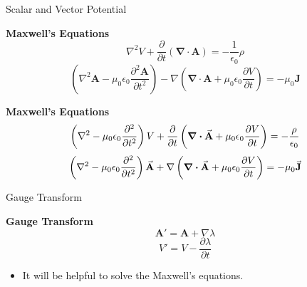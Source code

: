 \documentclass[9pt]{beamer}
\begin{document}
\begin{frame}{Scalar and Vector Potential}
    \begin{beamerboxesrounded}[shadow=true]{\bf Maxwell's Equations}
        \begin{equation}
            \nabla^{2} V+\frac{\partial}{\partial t}(\mathbf{\nabla} \cdot \mathbf{A})=-\frac{1}{\epsilon_{0}} \rho
        \end{equation}
        \begin{equation}
            \left(\nabla^{2} \mathbf{A}-\mu_{0} \epsilon_{0} \frac{\partial^{2} \mathbf{A}}{\partial t^{2}}\right)-\nabla\left(\mathbf{\nabla} \cdot \mathbf{A}+\mu_{0} \epsilon_{0} \frac{\partial V}{\partial t}\right)=-\mu_{0} \mathbf{J}
        \end{equation}
    \end{beamerboxesrounded}    
    \vspace{.5em}
    \begin{beamerboxesrounded}[shadow=true]{\bf Maxwell's Equations}
        \begin{equation}
            \left( \nabla^2 - \mu_0 \epsilon_0 \pdv[2]{}{t} \right) V + \pdv{}{t} \left( \div{\va{A}} + \mu_0 \epsilon_0 \pdv{V}{t} \right) = -\frac{\rho}{\epsilon_0}
        \end{equation}
        \begin{equation}
            \left( \nabla^2 - \mu_0 \epsilon_0 \pdv[2]{}{t} \right) \va{A} + \nabla \left( \div{\va{A}} + \mu_0 \epsilon_0 \pdv{V}{t} \right) = -\mu_0 \va{J}
        \end{equation}
    \end{beamerboxesrounded}
\end{frame}

\begin{frame}{Gauge Transform}
    \begin{beamerboxesrounded}[shadow=true]{\bf Gauge Transform}
        \begin{equation}
            \mathbf{A}'=\mathbf{A}+\nabla \lambda
        \end{equation}     
        \begin{equation}
            V'=V-\frac{\partial \lambda}{\partial t}
        \end{equation}
    \end{beamerboxesrounded}

    \begin{itemize}
        \item It will be helpful to solve the Maxwell's equations.
    \end{itemize}
\end{frame}
\end{document}
